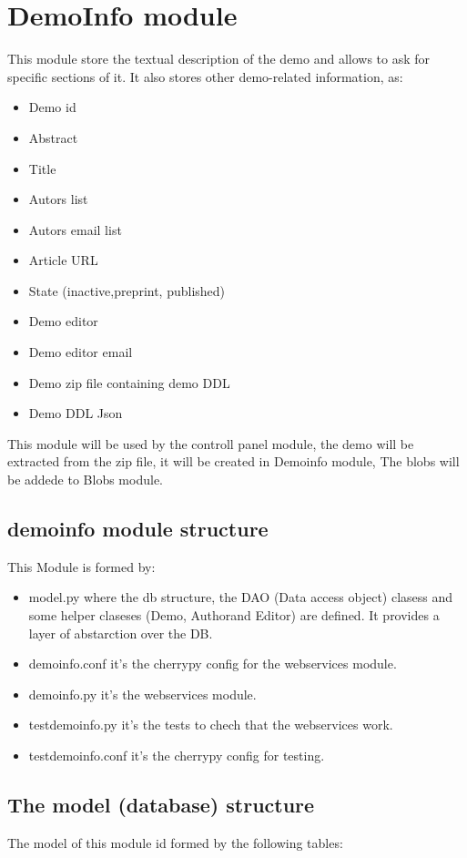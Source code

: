 \section{DemoInfo module}
This module store the textual description of the demo and allows to ask for specific sections of it. It also stores other demo-related information, as:
\begin{itemize}
\item Demo id
\item Abstract
\item Title 
\item Autors list
\item Autors email list
\item Article URL
\item State (inactive,preprint, published)
\item Demo editor
\item Demo editor email
\item Demo zip file containing demo DDL 
\item Demo DDL Json
\end{itemize}

This module will be used by the controll panel module, the demo will be extracted from the zip file, it will be created in Demoinfo module, The blobs will be addede to Blobs module.

\subsection{ demoinfo module structure}
This Module is formed by:
\begin{itemize}
\item model.py where the db structure, the DAO (Data access object) clasess and some helper claseses (Demo, Authorand Editor) are defined. It provides a layer of abstarction over the DB.
\item demoinfo.conf it's the cherrypy config for the webservices module.
\item demoinfo.py it's the webservices module.
\item testdemoinfo.py it's the tests to chech that the webservices work.
\item testdemoinfo.conf it's the cherrypy config for testing.
\end{itemize}

\subsection{The model (database) structure}
The model of this module id formed by the following tables:

